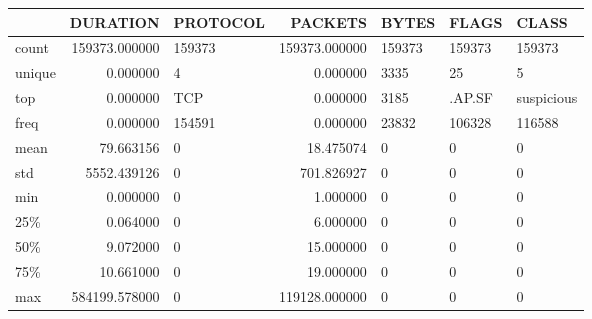 \begin{tabular}{lrlrlll}
\toprule
{} &       DURATION & PROTOCOL &        PACKETS &     BYTES &   FLAGS &       CLASS \\
\midrule
count  &  159373.000000 &   159373 &  159373.000000 &    159373 &  159373 &      159373 \\
unique &       0.000000 &        4 &       0.000000 &      3335 &      25 &           5 \\
top    &       0.000000 &    TCP   &       0.000000 &      3185 &  .AP.SF &  suspicious \\
freq   &       0.000000 &   154591 &       0.000000 &     23832 &  106328 &      116588 \\
mean   &      79.663156 &        0 &      18.475074 &         0 &       0 &           0 \\
std    &    5552.439126 &        0 &     701.826927 &         0 &       0 &           0 \\
min    &       0.000000 &        0 &       1.000000 &         0 &       0 &           0 \\
25\%    &       0.064000 &        0 &       6.000000 &         0 &       0 &           0 \\
50\%    &       9.072000 &        0 &      15.000000 &         0 &       0 &           0 \\
75\%    &      10.661000 &        0 &      19.000000 &         0 &       0 &           0 \\
max    &  584199.578000 &        0 &  119128.000000 &         0 &       0 &           0 \\
\bottomrule
\end{tabular}
